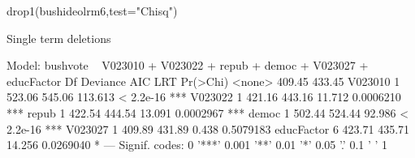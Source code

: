 \begin{Schunk}
\begin{Sinput}
 drop1(bushideolrm6,test="Chisq")
\end{Sinput}
\begin{Soutput}
Single term deletions

Model:
bushvote ~ V023010 + V023022 + repub + democ + V023027 + educFactor
           Df Deviance    AIC     LRT  Pr(>Chi)    
<none>          409.45 433.45                      
V023010     1   523.06 545.06 113.613 < 2.2e-16 ***
V023022     1   421.16 443.16  11.712 0.0006210 ***
repub       1   422.54 444.54  13.091 0.0002967 ***
democ       1   502.44 524.44  92.986 < 2.2e-16 ***
V023027     1   409.89 431.89   0.438 0.5079183    
educFactor  6   423.71 435.71  14.256 0.0269040 *  
---
Signif. codes:  0 '***' 0.001 '**' 0.01 '*' 0.05 '.' 0.1 ' ' 1
\end{Soutput}
\end{Schunk}
